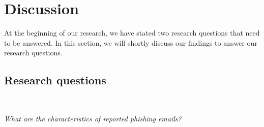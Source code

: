%

\chapter{Discussion}

At the beginning of our research, we have stated two research questions
that need to be answered. In this section, we will shortly discuss
our findings to answer our research questions.


\section{Research questions}

\ 

\textit{What are the characteristics of reported phishing emails?}

\ 

